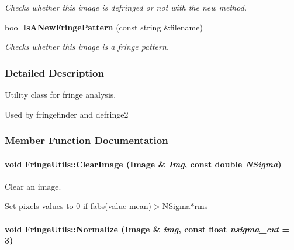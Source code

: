 \begin{CompactItemize}
\begin{CompactList}\small\item\em Checks whether this image is defringed or not with the new method.\item\end{CompactList}\item 
{}
bool {\bf Is\-ANew\-Fringe\-Pattern} (const string \&filename)\label{class_fringeutils_d12}

\begin{CompactList}\small\item\em Checks whether this image is a fringe pattern.\item\end{CompactList}\end{CompactItemize}


\subsubsection{Detailed Description}
Utility class for fringe analysis.

Used by fringefinder and defringe2 



\subsubsection{Member Function Documentation}
\paragraph{\setlength{\rightskip}{0pt plus 5cm}void Fringe\-Utils::Clear\-Image ({\bf Image} \& {\em Img}, const double {\em NSigma})\hspace{0.3cm}{\tt  [static]}}\hfill\label{class_fringeutils_d4}


Clear an image.

Set pixels values to 0 if fabs(value-mean)$>$NSigma$\ast$rms 
\paragraph{\setlength{\rightskip}{0pt plus 5cm}void Fringe\-Utils::Normalize ({\bf Image} \& {\em img}, const float {\em nsigma\_\-cut} = 3)\hspace{0.3cm}{\tt  [static]}}\hfill\label{class_fringeutils_d5}


